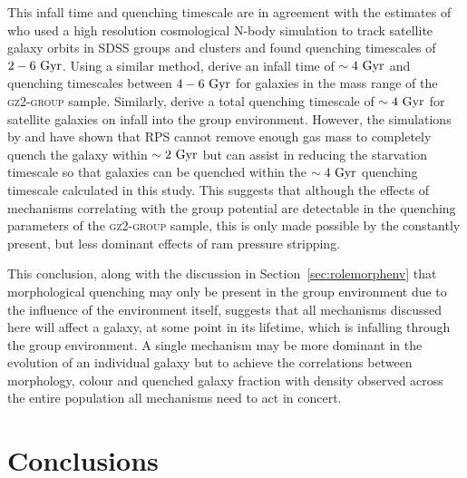This infall time and quenching timescale are in agreement with the estimates of \cite{wetzel13} who used a high resolution cosmological N-body simulation to track satellite galaxy orbits in SDSS groups and clusters and found quenching timescales of $2-6~\rm{Gyr}$. Using a similar method, \cite{oman16} derive an infall time of $\sim4~\rm{Gyr}$ and quenching timescales between $4-6~\rm{Gyr}$ for galaxies in the mass range of the \textsc{gz2-group} sample. Similarly, \cite{hahn16} derive a total quenching timescale of $\sim4~\rm{Gyr}$ for satellite galaxies on infall into the group environment. However, the simulations by \cite{fillingham16} and \cite{emerick16} have shown that RPS cannot remove enough gas mass to completely quench the galaxy within $\sim2~\rm{Gyr}$ but can assist in reducing the starvation timescale so that galaxies can be quenched within the $\sim4~\rm{Gyr}$ quenching timescale calculated in this study. This suggests that although the effects of mechanisms correlating with the group potential are detectable in the quenching parameters of the \textsc{gz2-group} sample, this is only made possible by the constantly present, but less dominant effects of ram pressure stripping. 

This conclusion, along with the discussion in Section~\ref{sec:rolemorphenv} that morphological quenching may only be present in the group environment due to the influence of the environment itself, suggests that all mechanisms discussed here will affect a galaxy, at some point in its lifetime, which is infalling through the group environment. A single mechanism may be more dominant in the evolution of an individual galaxy but to achieve the correlations between morphology, colour and quenched galaxy fraction with density observed across the entire population all mechanisms need to act in concert.  

\section{Conclusions}\label{sec:conc}

